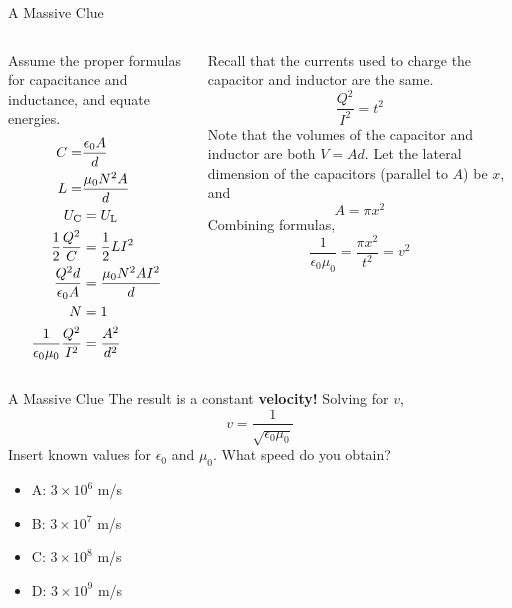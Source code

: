 \documentclass{beamer}
\begin{document}
\begin{frame}{A Massive Clue}
\small
\begin{columns}[T]
\begin{column}{0.5\textwidth}
Assume the proper formulas for capacitance and inductance, and equate energies.
\begin{align}
C =& \frac{\epsilon_0 A}{d} \\
L =& \frac{\mu_0 N^2 A}{d} \\
U_{\rm C} &= U_{\rm L} \\
\frac{1}{2}\frac{Q^2}{C} &= \frac{1}{2}LI^2 \\
\frac{Q^2 d}{\epsilon_0 A} &= \frac{\mu_0 N^2 A I^2}{d} \\
N &= 1 \\
\frac{1}{\epsilon_0 \mu_0} \frac{Q^2}{I^2} &= \frac{A^2}{d^2}
\end{align}
\end{column}
\begin{column}{0.5\textwidth}
Recall that the currents used to charge the capacitor and inductor are the same.
\begin{equation}
\frac{Q^2}{I^2} = t^2
\end{equation}
Note that the volumes of the capacitor and inductor are both $V = Ad$.  Let the lateral dimension of the capacitors (parallel to $A$) be $x$, and 
\begin{equation}
A = \pi x^2
\end{equation}
Combining formulas,
\begin{equation}
\frac{1}{\epsilon_0 \mu_0} = \frac{\pi x^2}{t^2} = v^2
\end{equation}
\end{column}
\end{columns}
\end{frame}

\begin{frame}{A Massive Clue}
\large
The result is a constant \textbf{\alert{velocity!}}  Solving for $v$,
\begin{equation}
\boxed{v = \frac{1}{\sqrt{\epsilon_0 \mu_0}}}
\end{equation}
Insert known values for $\epsilon_0$ and $\mu_0$.  What speed do you obtain?
\begin{itemize}
\item A: $3\times 10^{6}$ m/s
\item B: $3\times 10^{7}$ m/s
\item C: $3\times 10^{8}$ m/s
\item D: $3\times 10^{9}$ m/s
\end{itemize}
\end{frame}
\end{document}
